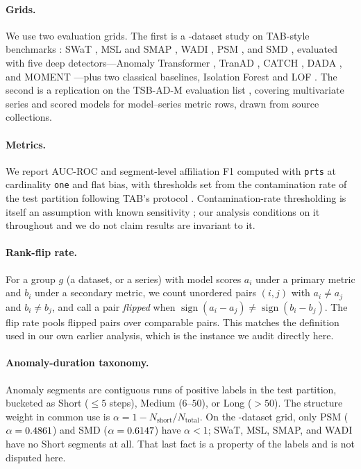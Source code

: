 \documentclass[twoside,11pt]{article}
\newcommand{\auc}{\mbox{AUC-ROC}}
\begin{document}
\paragraph{Grids.} We use two evaluation grids. The first is a
\TabDatasets-dataset study on TAB-style benchmarks \citep{qiu2025tab}: SWaT
\citep{mathur2016swat, goh2017swat}, MSL and SMAP \citep{hundman2018detecting},
WADI \citep{ahmed2017wadi}, PSM \citep{abdulaal2021psm}, and SMD
\citep{su2019robust}, evaluated with
five deep detectors---Anomaly Transformer \citep{xu2022anomaly}, TranAD
\citep{tuli2022tranad}, CATCH \citep{wu2025catch}, DADA \citep{shentu2025dada},
and MOMENT \citep{goswami2024moment}---plus two classical baselines, Isolation
Forest \citep{liu2008isolation} and LOF \citep{breunig2000lof}. The second is a replication on the TSB-AD-M evaluation list
\citep{liu2024elephant}, covering \TsbadSeries{} multivariate series and
\TsbadModels{} scored models for \TsbadRows{} model--series metric rows, drawn
from \TsbadCollections{} source collections.

\paragraph{Metrics.} We report \auc{} and segment-level affiliation F1
\citep{huet2022local} computed with \texttt{prts} at cardinality
\texttt{one} and flat bias, with thresholds set from the contamination rate of
the test partition following TAB's protocol \citep{qiu2025tab}. Contamination-rate
thresholding is itself an assumption with known sensitivity
\citep{masakuna2024impact, perini2023estimating}; our analysis conditions on it
throughout and we do not claim results are invariant to it.

\paragraph{Rank-flip rate.} For a group $g$ (a dataset, or a series) with model
scores $a_i$ under a primary metric and $b_i$ under a secondary metric, we count
unordered pairs $(i,j)$ with $a_i \neq a_j$ and $b_i \neq b_j$, and call a pair
\emph{flipped} when $\operatorname{sign}(a_i - a_j) \neq \operatorname{sign}(b_i - b_j)$.
The flip rate pools flipped pairs over comparable pairs. This matches the
definition used in our own earlier analysis, which is the instance we audit
directly here.

\paragraph{Anomaly-duration taxonomy.} Anomaly segments are contiguous runs of
positive labels in the test partition, bucketed as Short ($\leq 5$ steps), Medium
($6$--$50$), or Long ($> 50$). The structure weight in common use is
$\alpha = 1 - N_{\text{short}} / N_{\text{total}}$. On the
\TabDatasets-dataset grid, only PSM ($\alpha = 0.4861$) and SMD
($\alpha = 0.6147$) have $\alpha < 1$; SWaT, MSL, SMAP, and WADI have no Short
segments at all. That last fact is a property of the labels and is not disputed
here.
\end{document}
